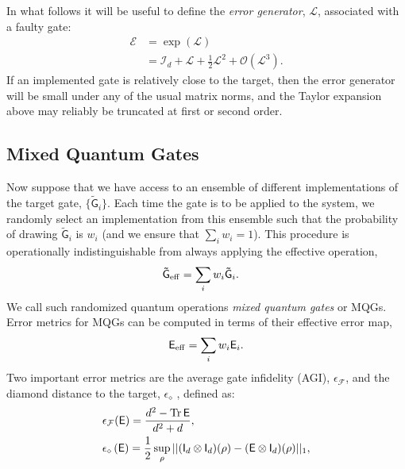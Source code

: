 \documentclass[aps,nofootinbib,pra,notitlepage,twocolumn]{revtex4-1}
\newcommand{\tr}{{\rm Tr\thinspace}}
\newcommand{\order}[1]{\mathcal{O}\left( #1 \right)}
\begin{document}
In what follows it will be useful to define the \emph{error generator}, $\mathcal{L}$, associated with a faulty gate: 
\begin{align}
	\label{eq:generator}
	\mathcal{E} 
		&= \exp\left(\mathcal{L}\right) \\
		&= \mathcal{I}_d + \mathcal{L} + \frac{1}{2}\mathcal{L}^2 + \order{\mathcal{L}^3}.
\end{align}
If an implemented gate is relatively close to the target, then the error generator will be small under any of the usual matrix norms, and the Taylor expansion above may reliably be truncated at first or second order. 


\subsection{Mixed Quantum Gates}
\noindent Now suppose that we have access to an ensemble of different implementations of the target gate, $\{\mathsf{\tilde G}_i\}$.
Each time the gate is to be applied to the system, we randomly select an implementation from this ensemble such that the probability of drawing $\mathsf{\tilde{G}}_i$ is $w_i$ (and we ensure that $\sum_i w_i=1$). This procedure is operationally indistinguishable from always applying the effective operation, 
\begin{align}
	\mathsf{\tilde G}_{\rm eff} &= \sum_i w_i \mathsf{\tilde G}_i.
\end{align}
We call such randomized quantum operations \emph{mixed quantum gates} or MQGs. Error metrics for MQGs can be computed in terms of their effective error map, 
\begin{equation}
	\label{eq:effective_error}
	\mathsf{E}_{\rm eff} = \sum_i w_i \mathsf{E}_i.
\end{equation}
Two important error metrics are the average gate infidelity (AGI), $\epsilon_\mathcal{F}$, and the diamond distance to the target, $\epsilon_\diamond$ \cite{}, defined as:
\begin{align}
	\label{eq:def_agi}
	&\epsilon_\mathcal{F}(\mathsf{E}) = \frac{d^2 - \tr{\mathsf{E}}}{d^2 + d},\\
	\label{eq:def_diamond}
	&\epsilon_\diamond \left(\mathsf{E}\right)
		= \frac{1}{2} \sup_\rho \vert \vert (\mathsf{I}_d\otimes \mathsf{I}_d)(\rho) 
										  - (\mathsf{E} \otimes \mathsf{I}_d)(\rho) \vert\vert_1,
\end{align}
\end{document}
